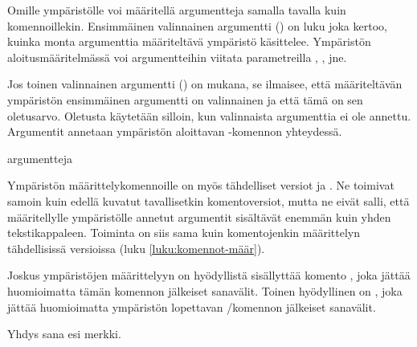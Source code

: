 \begin{koodilohkosis}
  \newenvironment{ymp}
  {\begin{mahtavuus}
      \omia\hienoja\asetuksia}
    {\end{mahtavuus}}
\end{koodilohkosis}

Omille ympäristölle voi määritellä argumentteja samalla tavalla kuin
komennoillekin. Ensimmäinen valinnainen argumentti () on luku
joka kertoo, kuinka monta argumenttia määriteltävä ympäristö käsittelee.
Ympäristön aloitusmääritelmässä voi argumentteihin viitata parametreilla
, ,  jne.

Jos toinen valinnainen argumentti () on mukana, se
ilmaisee, että määriteltävän ympäristön ensimmäinen argumentti on
valinnainen ja että tämä on sen ole\-tus\-arvo. Oletusta käytetään
silloin, kun valinnaista argumenttia ei ole annettu. Argumentit annetaan
ympäristön aloittavan -ko\-men\-non yhteydessä.

\begin{koodilohkosis}
  \begin{ymp}[valinnainen]{argu}{mentteja}
  \end{ymp}
\end{koodilohkosis}

Ympäristön määrittelykomennoille on myös tähdelliset versiot
 ja . Ne
toimivat samoin kuin edellä kuvatut tavallisetkin komentoversiot, mutta
ne eivät salli, että määritellylle ympäristölle annetut argumentit
sisältävät enemmän kuin yhden tekstikappaleen. Toiminta on siis sama
kuin komentojenkin määrittelyn tähdellisissä versioissa (luku
\ref{luku:komennot-määr}).

\begin{koodilohkosis}
  \newenvironment*   {nimi}[n][oletus]{aloitus}{lopetus}
  \renewenvironment* {nimi}[n][oletus]{aloitus}{lopetus}
\end{koodilohkosis}

Joskus ympäristöjen määrittelyyn on hyödyllistä sisällyttää komento
, joka jättää huomioimatta tämän komennon
jälkeiset sanavälit. Toinen hyödyllinen on , joka jättää huomioimatta ympäristön
lopettavan \-/komennon jälkeiset sanavälit.

\pagebreak[3]

\begin{koodilohkosis}
  \newenvironment{ymp}
    {Yhdys\ignorespaces}
    {esi\ignorespacesafterend}

  \begin{ymp}
    sana%
  \end{ymp}   merkki.
\end{koodilohkosis}

